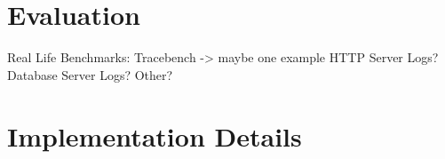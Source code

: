 \section{Evaluation}

Real Life Benchmarks:
                      Tracebench -> maybe one example
                      HTTP Server Logs?
                      Database Server Logs?
                      Other?

\section{Implementation Details}

